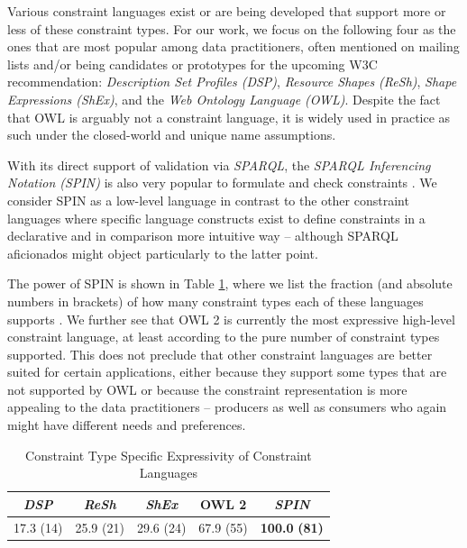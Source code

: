 \documentclass[a4paper,fontsize=11pt]{scrartcl}
\begin{document}
Various constraint languages exist or are being developed that support more or less of these constraint types. For our work, we focus on the following four as the ones that are most popular among data practitioners, often mentioned on mailing lists and/or being candidates or prototypes for the upcoming W3C recommendation:
\emph{Description Set Profiles (DSP)}, \emph{Resource Shapes (ReSh)}, \emph{Shape Expressions (ShEx)}, and the \emph{Web Ontology Language} \emph{(OWL)}. Despite the fact that OWL is arguably not a constraint language, it is widely used in practice as such under the closed-world and unique name assumptions.

With its direct support of validation via \emph{SPARQL}, the \emph{SPARQL Inferencing Notation (SPIN)} is also very popular to formulate and check constraints \cite{Fuerber2010}. We consider SPIN as a low-level language in contrast to the other constraint languages where specific language constructs exist to define constraints in a declarative and in comparison more intuitive way -- although SPARQL aficionados might object particularly to the latter point.

The power of SPIN is shown in 
Table \ref{tab:constraint-type-specific-expressivity}, where we list the fraction (and absolute numbers in brackets) of how many constraint types each of these languages supports \cite{BoschNolleAcarEckert2015}. 
We further see that OWL 2 is currently the most expressive high-level constraint language, at least according to the pure number of constraint types supported. This does not preclude that other constraint languages are better suited for certain applications, either because they support some types that are not supported by OWL or because the constraint representation is more appealing to the data practitioners -- producers as well as consumers who again might have different needs and preferences.

\begin{table}
	\centering
		\caption{Constraint Type Specific Expressivity of Constraint Languages}
	  \scriptsize
		\begin{tabular}{c|c|c|c|c}
			\emph{DSP} & \emph{ReSh} & \emph{ShEx} & OWL 2 & \emph{SPIN} \\	
      \hline
			17.3 (14) & 25.9 (21) & 29.6 (24) & 67.9 (55) & \textbf{100.0} \textbf{(81)} 
		\end{tabular}
	\label{tab:constraint-type-specific-expressivity}
\end{table}
\end{document}
